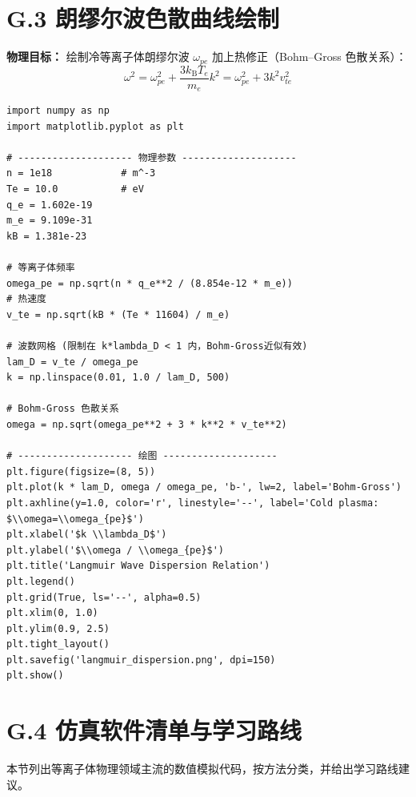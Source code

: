 \section{G.3 朗缪尔波色散曲线绘制}

\textbf{物理目标：} 绘制冷等离子体朗缪尔波 $\omega_{pe}$ 加上热修正（Bohm--Gross 色散关系）：
\begin{equation}
\omega^2 = \omega_{pe}^2 + \frac{3k_\mathrm{B}T_e}{m_e}k^2 = \omega_{pe}^2 + 3k^2v_{te}^2
\end{equation}

\begin{verbatim}
import numpy as np
import matplotlib.pyplot as plt

# -------------------- 物理参数 --------------------
n = 1e18            # m^-3
Te = 10.0           # eV
q_e = 1.602e-19
m_e = 9.109e-31
kB = 1.381e-23

# 等离子体频率
omega_pe = np.sqrt(n * q_e**2 / (8.854e-12 * m_e))
# 热速度
v_te = np.sqrt(kB * (Te * 11604) / m_e)

# 波数网格 (限制在 k*lambda_D < 1 内，Bohm-Gross近似有效)
lam_D = v_te / omega_pe
k = np.linspace(0.01, 1.0 / lam_D, 500)

# Bohm-Gross 色散关系
omega = np.sqrt(omega_pe**2 + 3 * k**2 * v_te**2)

# -------------------- 绘图 --------------------
plt.figure(figsize=(8, 5))
plt.plot(k * lam_D, omega / omega_pe, 'b-', lw=2, label='Bohm-Gross')
plt.axhline(y=1.0, color='r', linestyle='--', label='Cold plasma: $\\omega=\\omega_{pe}$')
plt.xlabel('$k \\lambda_D$')
plt.ylabel('$\\omega / \\omega_{pe}$')
plt.title('Langmuir Wave Dispersion Relation')
plt.legend()
plt.grid(True, ls='--', alpha=0.5)
plt.xlim(0, 1.0)
plt.ylim(0.9, 2.5)
plt.tight_layout()
plt.savefig('langmuir_dispersion.png', dpi=150)
plt.show()
\end{verbatim}


\section{G.4 仿真软件清单与学习路线}

本节列出等离子体物理领域主流的数值模拟代码，按方法分类，并给出学习路线建议。

